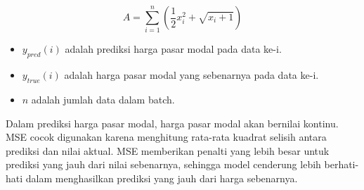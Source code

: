\[
A = \sum_{i=1}^{n} \left( \frac{1}{2} x_i^2 + \sqrt{x_i + 1} \right)
\]

\begin{itemize}
    \item \( y_{pred}(i) \) adalah prediksi harga pasar modal pada data ke-i.
    \item \( y_{true}(i) \) adalah harga pasar modal yang sebenarnya pada data ke-i.
    \item \( n \) adalah jumlah data dalam batch.
\end{itemize}

Dalam prediksi harga pasar modal, harga pasar modal akan bernilai kontinu. MSE cocok digunakan karena menghitung rata-rata kuadrat selisih antara prediksi dan nilai aktual. MSE memberikan penalti yang lebih besar untuk prediksi yang jauh dari nilai sebenarnya, sehingga model cenderung lebih berhati-hati dalam menghasilkan prediksi yang jauh dari harga sebenarnya.


